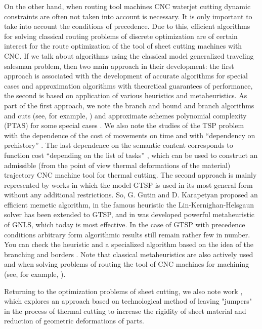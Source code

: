 \documentclass[numbers,sort&compress]{IntechOpen-Book}%
\begin{document}
On the other hand, when routing tool machines
CNC waterjet cutting dynamic constraints are often not taken into account
is necessary. It is only important to take into account the conditions of precedence.
Due to this,
efficient algorithms for solving classical routing problems of discrete optimization are of certain interest for the route optimization of the tool of sheet cutting machines with CNC.
If we talk about algorithms using the classical model
generalized traveling salesman problem, then two main
approach in their development:
the first approach is associated with the development of accurate
algorithms for special cases and approximation algorithms with
theoretical guarantees of performance, the second is based on
application of various heuristics and metaheuristics.
As part of the first approach, we note the branch and bound and branch algorithms
and cuts (see, for example, \cite{bibx:228}) and approximate schemes
polynomial complexity (PTAS) for some special cases
\cite{bibx:214}. We also note the studies of the TSP problem with
the dependence of the cost of movements on time
\cite{bibx:218,bibx:219} and with ``dependency on
prehistory''
\cite{bibx:221}. The last dependence on the semantic
content corresponds to function
cost ``depending on the list of tasks''
\cite{1,3}, which
can be used to construct an admissible (from the point of view
thermal deformations of the material) trajectory
CNC machine tool for thermal cutting.
The second approach is mainly represented by works in which the model
GTSP is used in its most general form without any additional
restrictions. So, G. Gutin and D. Karapetyan \cite{Gutin-2010}
proposed an efficient memetic algorithm, in
\cite{Helsgaun-2015} the famous heuristic
the Lin-Kernighan-Helsgaun solver has been extended to GTSP,
and in \cite{bibx:230} was developed
powerful metaheuristic of GNLS, which today is
most effective. In the case of GTSP with precedence conditions
arbitrary form algorithmic results still remain
rather few in number. You can check the \cite{SALMAN2016} heuristic
and a specialized algorithm based on the idea of the branching and
borders \cite{SALMAN2020}.
Note that classical metaheuristics are also actively used and
when solving problems of routing the tool of CNC machines for
machining (see, for example, \cite{bibx:305,bibx:300,bibx:304}).

Returning to the optimization problems of sheet cutting, we also note
work \cite{bibx:117}, which explores an approach based on
technological method of leaving "jumpers" in the process of thermal
cutting to increase the rigidity of sheet material
and reduction of geometric deformations of parts.
\end{document}
